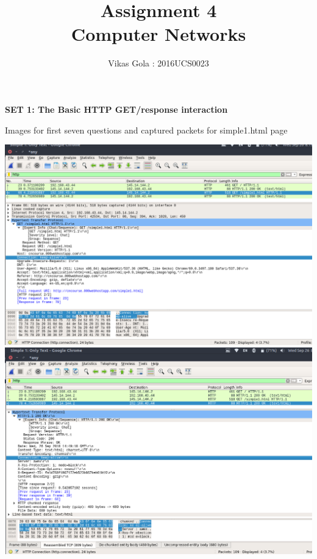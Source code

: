 \documentclass[14pt]{extarticle}
\begin{document}
    \pagestyle{plain}

    \title{\Huge Assignment 4\\ Computer Networks}
    \author{\huge Vikas Gola : 2016UCS0023}
    \maketitle
    \newpage

    \begin{center}
        {\large \textbf{SET 1: The Basic HTTP GET/response interaction }}
    \end{center}


    \begin{center}
        {\large \textmd{Images for first seven questions and captured packets for simple1.html page}}\\
    \end{center}
    \includegraphics[scale=0.40]{1_1}\\[10pt]
    \includegraphics[scale=0.40]{1_2}\\[10pt]
\end{document}
